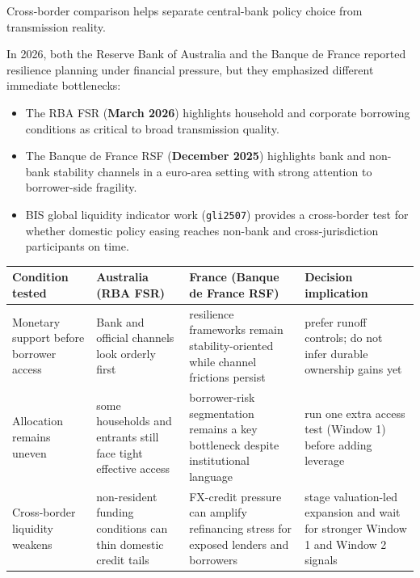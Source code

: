 \documentclass[11pt,openany]{book}
\begin{document}
Cross-border comparison helps separate central-bank policy choice from transmission reality.

In 2026, both the Reserve Bank of Australia and the Banque de France reported resilience planning under financial pressure, but they emphasized different immediate bottlenecks:

\begin{itemize}
  \item The RBA FSR (\textbf{March 2026}) highlights household and corporate borrowing conditions as critical to broad transmission quality.
  \item The Banque de France RSF (\textbf{December 2025}) highlights bank and non-bank stability channels in a euro-area setting with strong attention to borrower-side fragility.
  \item BIS global liquidity indicator work (\texttt{gli2507}) provides a cross-border test for whether domestic policy easing reaches non-bank and cross-jurisdiction participants on time.
\end{itemize}

\begin{center}
\small
\begin{tabularx}{\textwidth}{>{\raggedright\arraybackslash}p{}>{\raggedright\arraybackslash}p{}>{\raggedright\arraybackslash}p{}>{\raggedright\arraybackslash}p{}}
\toprule
\textbf{Condition tested} & \textbf{Australia (RBA FSR)} & \textbf{France (Banque de France RSF)} & \textbf{Decision implication} \\
\midrule
Monetary support before borrower access & Bank and official channels look orderly first & resilience frameworks remain stability-oriented while channel frictions persist & prefer runoff controls; do not infer durable ownership gains yet \\
Allocation remains uneven & some households and entrants still face tight effective access & borrower-risk segmentation remains a key bottleneck despite institutional language & run one extra access test (Window 1) before adding leverage \\
Cross-border liquidity weakens & non-resident funding conditions can thin domestic credit tails & FX-credit pressure can amplify refinancing stress for exposed lenders and borrowers & stage valuation-led expansion and wait for stronger Window 1 and Window 2 signals \\
\bottomrule
\end{tabularx}
\normalsize
\end{center}
\end{document}

